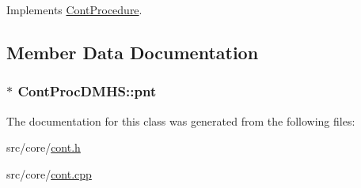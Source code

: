 Implements \hyperlink{a00067_a7f7adefe250a00b3778669ef649f03ac}{Cont\-Procedure}.



\subsection{Member Data Documentation}
\hypertarget{a00066_a517ed8f7ba18697cdf76b10c2b95c499}{
\subsubsection[{pnt}]{$\ast$ Cont\-Proc\-D\-M\-H\-S\-::pnt\hspace{0.3cm}{\ttfamily [private]}}}\label{a00066_a517ed8f7ba18697cdf76b10c2b95c499}


The documentation for this class was generated from the following files\-:\begin{DoxyCompactItemize}
\item 
src/core/\hyperlink{a00218}{cont.\-h}\item 
src/core/\hyperlink{a00217}{cont.\-cpp}\end{DoxyCompactItemize}
